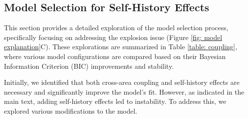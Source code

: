 \documentclass[12pt]{article}
\begin{document}







\subsection*{Model Selection for Self-History Effects}

This section provides a detailed exploration of the model selection process, specifically focusing on addressing the explosion issue (Figure \ref{fig: model explanation}C). These explorations are summarized in Table \ref{table: coupling}, where various model configurations are compared based on their Bayesian Information Criterion (BIC) improvements and stability.

Initially, we identified that both cross-area coupling and self-history effects are necessary and significantly improve the model's fit. However, as indicated in the main text, adding self-history effects led to instability. To address this, we explored various modifications to the model.
\end{document}
